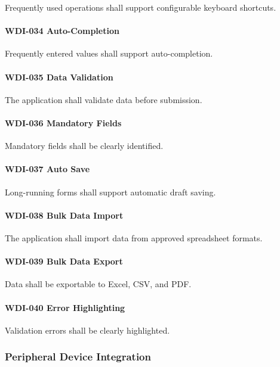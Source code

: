 Frequently used operations shall support configurable keyboard
shortcuts.

\paragraph{WDI-034 Auto-Completion}

Frequently entered values shall support auto-completion.

\paragraph{WDI-035 Data Validation}

The application shall validate data before submission.

\paragraph{WDI-036 Mandatory Fields}

Mandatory fields shall be clearly identified.

\paragraph{WDI-037 Auto Save}

Long-running forms shall support automatic draft saving.

\paragraph{WDI-038 Bulk Data Import}

The application shall import data from approved spreadsheet formats.

\paragraph{WDI-039 Bulk Data Export}

Data shall be exportable to Excel, CSV, and PDF.

\paragraph{WDI-040 Error Highlighting}

Validation errors shall be clearly highlighted.


\subsubsection*{Peripheral Device Integration}

